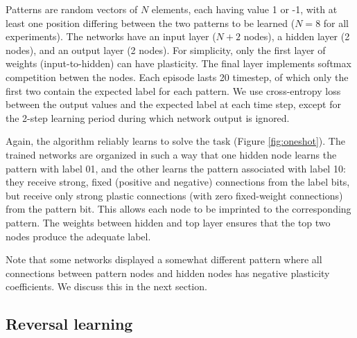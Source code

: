 \documentclass{article}
\begin{document}
 Patterns are random vectors of $N$ elements, each having
value 1 or -1, with at least one position differing between the two patterns to
be learned ($N=8$ for all experiments). The networks have an input layer ($N+2$ nodes), a hidden layer (2 nodes), and an
output layer (2 nodes). For simplicity, only the first layer of weights
(input-to-hidden) can have plasticity. The final layer implements softmax
competition betwen the nodes. Each episode lasts 20 timestep, of which only the first
two contain the expected label for each pattern. We use cross-entropy loss
between the output values and the expected label at each time step, except for
the 2-step learning period during which network output is ignored.


Again, the algorithm reliably learns to solve the task (Figure
\ref{fig:oneshot}). The trained networks are
organized in such a way that one hidden node learns the pattern with label 01,
and the other learns the pattern associated with label 10: they receive strong,
fixed (positive and negative) connections from the label bits, but receive only
strong plastic connections (with zero fixed-weight connections) from the pattern
bit. This allows each node to be imprinted to the corresponding pattern. The weights between hidden and top layer ensures that the top two nodes
produce the adequate label.

Note that some networks displayed a somewhat different pattern where all
connections between pattern nodes and hidden nodes has negative plasticity
coefficients. We discuss this in the next section.

\subsection{Reversal learning}
\end{document}
